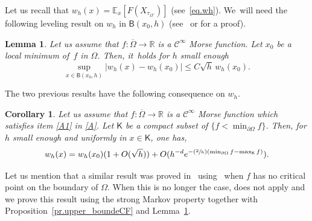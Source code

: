 \documentclass[10pt]{amsart}
\newcommand{\Psfrac}[2]{(\sfrac{#1}{#2})}
\theoremstyle{plain}
\newtheorem{lemma}[proposition]{Lemma}
\newtheorem{corollary}[proposition]{Corollary}
\theoremstyle{definition}
\begin{document}
Let us recall that $w_h(x)=\mathbb E_{x} [F(X_{\tau_{\Omega^c}})]$ (see~\eqref{eq.wh}). We~will need the following leveling result on $w_h$ in $\mathsf
B(x_0,h)$ (see~\cite[Lem.\,1]{kamin1979elliptic} or \cite[Lem.\,3]{NePC} for a proof).

\begin{lemma}\label{le.upper_boundeF}
Let us assume that $f:\overline \Omega\to \mathbb R$ is a $\mathcal C^\infty$ Morse function. Let $x_0$ be a local minimum of~$f$ in $\Omega$.
Then, it~holds for $h$ small enough
\[
\sup_{x\in { \mathsf B(x_0,h)}} \vert w_h(x) -w_h(x_0)\vert\le C \sqrt h \, w_h(x_0).
\]
\end{lemma}

The two previous results have the following consequence on $w_h$.

\begin{corollary}\label{co.Px}
Let us assume that $f:\overline \Omega\to \mathbb R$ is a $\mathcal C^\infty$ Morse function which satisfies item \eqref{A1} in \ref{A}.
Let $\mathsf K$ be a compact subset of $\{f<\min_{\partial \Omega}f\}$.
Then, for $h$ small enough and uniformly in $x\in \mathsf K$, one has,
\[
w_h(x) =w_h(x_0)(1+O(\sqrt h))+ O(h^{-d}e^{-\Psfrac 2h (\min_{\partial \Omega }f-\max_{\mathsf K} f)}).
\]
\end{corollary}

Let us mention that a similar result was proved in~\cite[\S5.1.4]{DLLN} using~\cite[Th.\,1]{eizenberg-90} when $f$ has no critical point on the boundary of $\Omega$. When this is no longer the case, \cite[Th.\,1]{eizenberg-90} does not apply and we prove this result using the strong Markov property together with Proposition~\ref{pr.upper_boundeCF} and Lemma~\ref{le.upper_boundeF}.
\end{document}

